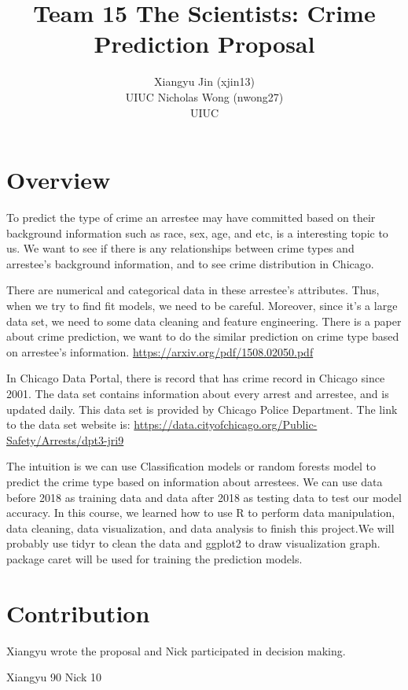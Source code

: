 \documentclass[
  article]{jss}
\author{Xiangyu Jin (xjin13)\\UIUC \And Nicholas Wong (nwong27)\\UIUC}
\title{Team 15 The Scientists: Crime Prediction Proposal}
\begin{document}
\maketitle
\ifdefined\Shaded\renewenvironment{Shaded}{\begin{tcolorbox}[interior hidden, boxrule=0pt, sharp corners, breakable, frame hidden, enhanced, borderline west={3pt}{0pt}{shadecolor}]}{\end{tcolorbox}}\fi

\hypertarget{sec-intro}{%
\section{Overview}\label{sec-intro}}

To predict the type of crime an arrestee may have committed based on
their background information such as race, sex, age, and etc, is a
interesting topic to us. We want to see if there is any relationships
between crime types and arrestee's background information, and to see
crime distribution in Chicago.

There are numerical and categorical data in these arrestee's attributes.
Thus, when we try to find fit models, we need to be careful. Moreover,
since it's a large data set, we need to some data cleaning and feature
engineering. There is a paper about crime prediction, we want to do the
similar prediction on crime type based on arrestee's information.
\url{https://arxiv.org/pdf/1508.02050.pdf}

In Chicago Data Portal, there is record that has crime record in Chicago
since 2001. The data set contains information about every arrest and
arrestee, and is updated daily. This data set is provided by Chicago
Police Department. The link to the data set website is:
\url{https://data.cityofchicago.org/Public-Safety/Arrests/dpt3-jri9}

The intuition is we can use Classification models or random forests
model to predict the crime type based on information about arrestees. We
can use data before 2018 as training data and data after 2018 as testing
data to test our model accuracy. In this course, we learned how to use R
to perform data manipulation, data cleaning, data visualization, and
data analysis to finish this project.We will probably use tidyr to clean
the data and ggplot2 to draw visualization graph. package caret will be
used for training the prediction models.

\hypertarget{contribution}{%
\section{Contribution}\label{contribution}}

Xiangyu wrote the proposal and Nick participated in decision making.

Xiangyu 90 Nick 10


  
\end{document}
